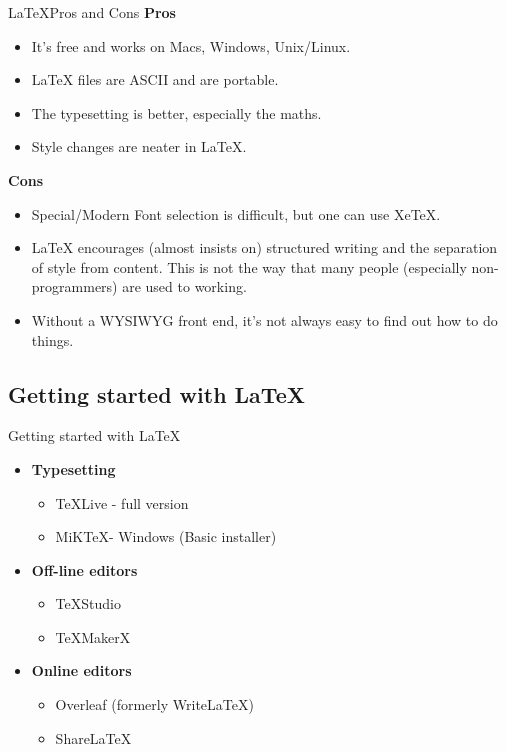 \documentclass[10pt,times]{beamer}
\begin{document}

\begin{frame}{\LaTeX Pros and Cons}
\textbf{Pros}
\begin{itemize}
\item    It's free and works on Macs, Windows, Unix/Linux.
\item    LaTeX files are ASCII and are portable.
\item    The typesetting is better, especially the maths.
\item    Style changes are neater in LaTeX.
\end{itemize}
\textbf{Cons}
\begin{itemize}
\item    Special/Modern Font selection is difficult, but one can use XeTeX.
\item    LaTeX encourages (almost insists on) structured writing and the 
separation of style from content. This is not the way that many people 
(especially non-programmers) are used to working.
\item    Without a WYSIWYG front end, it's not always easy to find out how to 
do things.
\end{itemize}
\end{frame}

\subsection{Getting started with \LaTeX}
\begin{frame}{Getting started with \LaTeX}
\begin{itemize}
\item \textbf{Typesetting}
\begin{itemize}
\item \TeX Live - full version
\item MiK\TeX - Windows (Basic installer)
\end{itemize}
\item \textbf{Off-line editors}
\begin{itemize}
\item \TeX Studio
\item \TeX MakerX
\end{itemize}
\item \textbf{Online editors}
\begin{itemize}
\item Overleaf (formerly Write\LaTeX)
\item Share\LaTeX
\end{itemize}

\end{itemize}

\end{frame}
\end{document}
